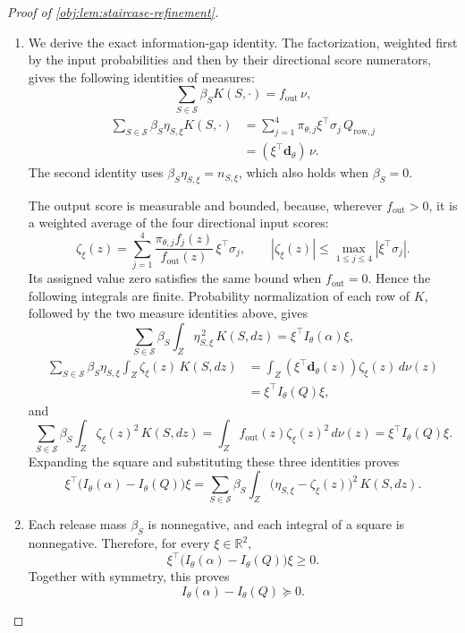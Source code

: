 \begin{proof}[Proof of \cref{obj:lem:staircase-refinement}]
\begin{enumerate}
\item
We derive the exact information-gap identity. The factorization, weighted first by the input probabilities and then by their directional score numerators, gives the following identities of measures:
\[
\sum_{S\in\mathcal S}\beta_S K(S,\cdot)
=f_{\mathrm{out}}\,\nu,
\]
\[
\begin{aligned}
\sum_{S\in\mathcal S}\beta_S\eta_{S,\xi}K(S,\cdot)
&=\sum_{j=1}^{4}
  \pi_{\theta,j}\xi^\top\sigma_j\,Q_{\mathrm{row},j}\\
&=(\xi^\top\mathbf d_\theta)\,\nu.
\end{aligned}
\]
The second identity uses \(\beta_S\eta_{S,\xi}=n_{S,\xi}\), which also holds when \(\beta_S=0\).

The output score is measurable and bounded, because, wherever \(f_{\mathrm{out}}>0\), it is a weighted average of the four directional input scores:
\[
\zeta_\xi(z)
=
\sum_{j=1}^{4}
\frac{\pi_{\theta,j}f_j(z)}{f_{\mathrm{out}}(z)}
\,\xi^\top\sigma_j,
\qquad
|\zeta_\xi(z)|
\le\max_{1\le j\le4}|\xi^\top\sigma_j|.
\]
Its assigned value zero satisfies the same bound when \(f_{\mathrm{out}}=0\). Hence the following integrals are finite. Probability normalization of each row of \(K\), followed by the two measure identities above, gives
\[
\sum_{S\in\mathcal S}\beta_S
\int_Z\eta_{S,\xi}^{\,2}\,K(S,dz)
=\xi^\top I_\theta(\alpha)\xi,
\]
\[
\begin{aligned}
\sum_{S\in\mathcal S}\beta_S\eta_{S,\xi}
\int_Z\zeta_\xi(z)\,K(S,dz)
&=\int_Z(\xi^\top\mathbf d_\theta(z))\zeta_\xi(z)\,d\nu(z)\\
&=\xi^\top I_\theta(Q)\xi,
\end{aligned}
\]
and
\[
\sum_{S\in\mathcal S}\beta_S
\int_Z\zeta_\xi(z)^2\,K(S,dz)
=
\int_Z f_{\mathrm{out}}(z)\zeta_\xi(z)^2\,d\nu(z)
=\xi^\top I_\theta(Q)\xi.
\]
Expanding the square and substituting these three identities proves
\[
\xi^\top\bigl(I_\theta(\alpha)-I_\theta(Q)\bigr)\xi
=
\sum_{S\in\mathcal S}\beta_S
\int_Z\bigl(\eta_{S,\xi}-\zeta_\xi(z)\bigr)^2\,K(S,dz).
\]

\item
Each release mass \(\beta_S\) is nonnegative, and each integral of a square is nonnegative. Therefore, for every \(\xi\in\mathbb R^2\),
\[
\xi^\top\bigl(I_\theta(\alpha)-I_\theta(Q)\bigr)\xi\ge0.
\]
Together with symmetry, this proves
\[
I_\theta(\alpha)-I_\theta(Q)\succeq0.
\]


\end{enumerate}
\end{proof}

